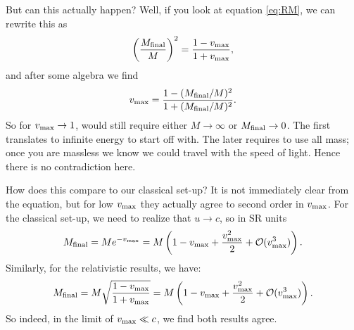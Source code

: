 \documentclass[12pt]{article}
\newcommand{\be}{\begin{eqnarray}}
\newcommand{\ee}{\end{eqnarray}}
\newif\ifshowboardanswers
\newif\ifshowboardquestion
\newcommand{\boardanswer}[1]{\ifshowboardanswers\\[0.35em]\textcolor{blue}{\textbf{Answer.} #1}\fi}
\begin{document}
But can this actually happen? Well, if you look at equation \eqref{eq:RM}, we can rewrite this as 
\be
\left(\frac{M_{\rm final}}{M}\right)^2 = \frac{1-v_{\rm max}}{1+v_{\rm max}}, 
\ee
and after some algebra we find 
\be
v_{\rm max}  = \frac{1-(M_{\rm final}/M)^2}{1+(M_{\rm final}/M)^2}.
\ee
So for $v_{\rm max} \rightarrow 1$, would still require either $M\rightarrow \infty$ or $M_{\rm final} \rightarrow 0$. The first translates to infinite energy to start off with. The later requires to use all mass; once you are massless we know we could travel with the speed of light. Hence there is no contradiction here. 


How does this compare to our classical set-up? It is not immediately clear from the equation, but for low $v_{\rm max}$ they actually agree to second order in $v_{\rm max}$. For the classical set-up, we need to realize that $u \rightarrow c$, so in SR units
\be
M_{\rm final} = Me^{-v_{\rm max}}= M\left( 1 - v_{\rm max} + \frac{v_{\rm max}^2}{2} + \mathcal{O}(v_{\rm max}^3)\right).
\ee
Similarly, for the relativistic results, we have:
\be
M_{\rm final} = M \sqrt{\frac{1-v_{\rm max}}{1+v_{\rm max}}} = M\left( 1 - v_{\rm max} + \frac{v_{\rm max}^2}{2} + \mathcal{O}(v_{\rm max}^3)\right). 
\ee
So indeed, in the limit of $v_{\rm max}\ll c$, we find both results agree. 
\ifshowboardquestion
\section*{Board Question}
\begin{tcolorbox}[colback=blue!5!white]
A constant force $F$ acts on a particle of rest mass $m$ in the lab frame, starting from rest at $t=0$.
\begin{enumerate}
    \item Use $F=dp/dt$ to find $p(t)$.
    \boardanswer{Starting from rest, $p(t)=Ft$.}
    \item Use $p=\gamma mv$ to find $v(t)$.
    \boardanswer{With $c=1$, $p=mv/\sqrt{1-v^2}$. Solving gives $v(t)=Ft/\sqrt{m^2+F^2t^2}$.}
    \item Show that $v(t)$ approaches $c$ but never exceeds it.
    \boardanswer{Restoring $c$, $v(t)=cFt/\sqrt{m^2c^2+F^2t^2}$, so $v<c$ for finite $t$ and $v\to c$ as $t\to\infty$.}
    \item Discuss what happens to the coordinate acceleration as time increases.
    \boardanswer{The coordinate acceleration decreases with time because more work goes into increasing $\gamma$ rather than increasing $v$.}
\end{enumerate}
\end{tcolorbox}
\fi
\end{document}
